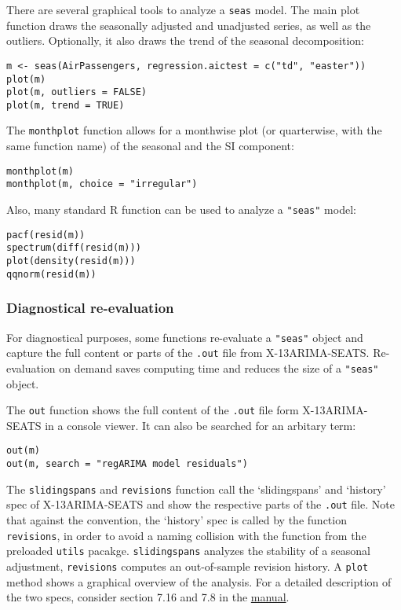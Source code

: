 There are several graphical tools to analyze a \texttt{seas} model. The
main plot function draws the seasonally adjusted and unadjusted series,
as well as the outliers. Optionally, it also draws the trend of the
seasonal decomposition:

\begin{verbatim}
m <- seas(AirPassengers, regression.aictest = c("td", "easter"))
plot(m)
plot(m, outliers = FALSE)
plot(m, trend = TRUE)
\end{verbatim}

The \texttt{monthplot} function allows for a monthwise plot (or
quarterwise, with the same function name) of the seasonal and the SI
component:

\begin{verbatim}
monthplot(m)
monthplot(m, choice = "irregular")
\end{verbatim}

Also, many standard R function can be used to analyze a \texttt{"seas"}
model:

\begin{verbatim}
pacf(resid(m))
spectrum(diff(resid(m)))
plot(density(resid(m)))
qqnorm(resid(m))
\end{verbatim}

\subsubsection{Diagnostical
re-evaluation}\label{diagnostical-re-evaluation}

For diagnostical purposes, some functions re-evaluate a \texttt{"seas"}
object and capture the full content or parts of the \texttt{.out} file
from X-13ARIMA-SEATS. Re-evaluation on demand saves computing time and
reduces the size of a \texttt{"seas"} object.

The \texttt{out} function shows the full content of the \texttt{.out}
file form X-13ARIMA-SEATS in a console viewer. It can also be searched
for an arbitary term:

\begin{verbatim}
out(m)
out(m, search = "regARIMA model residuals")
\end{verbatim}

The \texttt{slidingspans} and \texttt{revisions} function call the
`slidingspans' and `history' spec of X-13ARIMA-SEATS and show the
respective parts of the \texttt{.out} file. Note that against the
convention, the `history' spec is called by the function
\texttt{revisions}, in order to avoid a naming collision with the
function from the preloaded \texttt{utils} pacakge.
\texttt{slidingspans} analyzes the stability of a seasonal adjustment,
\texttt{revisions} computes an out-of-sample revision history. A
\texttt{plot} method shows a graphical overview of the analysis. For a
detailed description of the two specs, consider section 7.16 and 7.8 in
the \href{http://www.census.gov/ts/x13as/docX13AS.pdf}{manual}.

